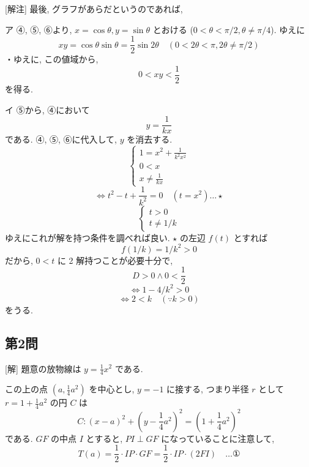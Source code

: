 \documentclass[../main.tex]{subfiles}
\begin{document}
\bigskip

[解注] 最後, グラフがあらだというのであれば,

\medskip

ア ④, ⑤, ⑥より, $x = \cos\theta, y = \sin\theta$ とおける ($0 < \theta < \pi/2, \theta \neq \pi/4$). ゆえに
\[
  xy = \cos\theta \sin\theta = \frac{1}{2} \sin 2\theta \quad (0 < 2\theta < \pi, 2\theta \neq \pi/2)
\]
・ゆえに, この値域から,
\[
  0 < xy < \frac{1}{2}
\]
を得る.

\medskip

イ ⑤から, ④において
\[
  y = \frac{1}{k x}
\]
である. ④, ⑤, ⑥に代入して, $y$ を消去する.
\[
  \begin{cases}
    1 = x^2 + \frac{1}{k^2 x^2} \\
    0 < x \\
    x \neq \frac{1}{k x}
  \end{cases}
\]
\[
  \iff t^2 - t + \frac{1}{k^2} = 0 \quad (t = x^2) \dots \star
\]
\[
  \begin{cases}
    t > 0 \\
    t \neq 1/k
  \end{cases}
\]
ゆえにこれが解を持つ条件を調べれば良い. $\star$ の左辺 $f(t)$ とすれば
\[
  f(1/k) = 1/k^2 > 0
\]
だから, $0 < t$ に 2 解持つことが必要十分で,
\[
  D > 0 \land 0 < \frac{1}{2}
\]
\[
  \iff 1 - 4/k^2 > 0
\]
\[
  \iff 2 < k \quad (\because k > 0)
\]
をうる.

\subsection*{第2問}

[解] 題意の放物線は $y = \frac{1}{4} x^2$ である.

この上の点 $(a, \frac{1}{4} a^2)$ を中心とし, $y = -1$ に接する, つまり半径 $r$ として $r = 1 + \frac{1}{4} a^2$ の円 $C$ は
\[
  C : (x - a)^2 + \left(y - \frac{1}{4} a^2\right)^2 = \left(1 + \frac{1}{4} a^2\right)^2
\]
である. $GF$ の中点 $I$ とすると, $PI \perp GF$ になっていることに注意して,
\[
  T(a) = \frac{1}{2} \cdot IP \cdot GF = \frac{1}{2} \cdot IP \cdot (2 FI) \quad \dots \text{①}
\]
\end{document}
